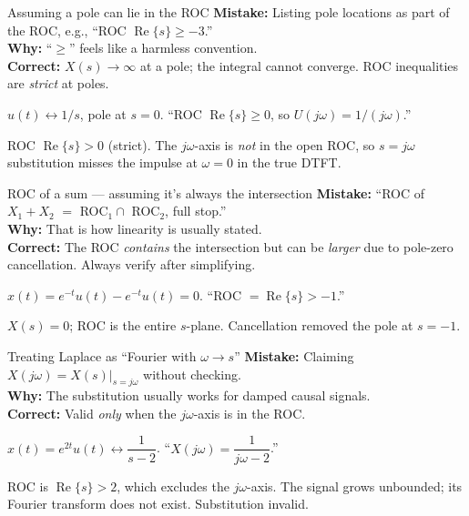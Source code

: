 \documentclass[11pt]{article}
\renewcommand{\Re}{\operatorname{Re}}
\begin{document}
\begin{pitfallbox}{Assuming a pole can lie in the ROC}
\textbf{Mistake:} Listing pole locations as part of the ROC, e.g., ``ROC $\Re\{s\} \ge -3$.''\\
\textbf{Why:} ``$\ge$'' feels like a harmless convention.\\
\textbf{Correct:} $X(s)\to\infty$ at a pole; the integral cannot converge. ROC inequalities are \emph{strict} at poles.
\begin{wrongbox}
$u(t) \leftrightarrow 1/s$, pole at $s=0$. ``ROC $\Re\{s\} \ge 0$, so $U(j\omega) = 1/(j\omega)$.''
\end{wrongbox}
\begin{rightbox}
ROC $\Re\{s\} > 0$ (strict). The $j\omega$-axis is \emph{not} in the open ROC, so $s=j\omega$ substitution misses the impulse at $\omega=0$ in the true DTFT.
\end{rightbox}
\end{pitfallbox}

\begin{pitfallbox}{ROC of a sum --- assuming it's always the intersection}
\textbf{Mistake:} ``ROC of $X_1 + X_2$ $=$ ROC$_1 \cap$ ROC$_2$, full stop.''\\
\textbf{Why:} That is how linearity is usually stated.\\
\textbf{Correct:} The ROC \emph{contains} the intersection but can be \emph{larger} due to pole-zero cancellation. Always verify after simplifying.
\begin{wrongbox}
$x(t) = e^{-t}u(t) - e^{-t}u(t) = 0$. ``ROC $= \Re\{s\} > -1$.''
\end{wrongbox}
\begin{rightbox}
$X(s) = 0$; ROC is the entire $s$-plane. Cancellation removed the pole at $s=-1$.
\end{rightbox}
\end{pitfallbox}

\begin{pitfallbox}{Treating Laplace as ``Fourier with $\omega \to s$''}
\textbf{Mistake:} Claiming $X(j\omega) = X(s)|_{s=j\omega}$ without checking.\\
\textbf{Why:} The substitution usually works for damped causal signals.\\
\textbf{Correct:} Valid \emph{only} when the $j\omega$-axis is in the ROC.
\begin{wrongbox}
$x(t) = e^{2t}u(t) \leftrightarrow \dfrac{1}{s-2}$. ``$X(j\omega) = \dfrac{1}{j\omega - 2}$.''
\end{wrongbox}
\begin{rightbox}
ROC is $\Re\{s\} > 2$, which excludes the $j\omega$-axis. The signal grows unbounded; its Fourier transform does not exist. Substitution invalid.
\end{rightbox}
\end{pitfallbox}
\end{document}
